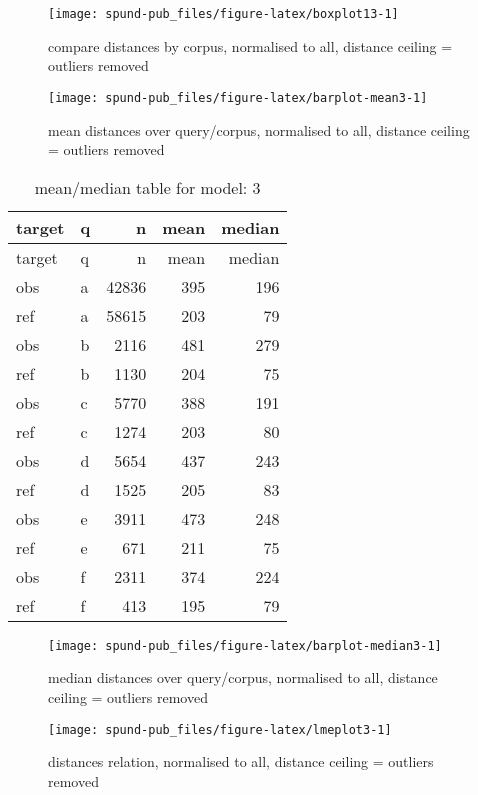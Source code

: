 \documentclass[
  12pt,
  oneside]{book}
\begin{document}
\begin{figure}[H]
\texttt{[image: spund-pub\_files/figure-latex/boxplot13-1]} \caption{compare distances by corpus, normalised to all, distance ceiling =  outliers removed}\label{fig:boxplot13}
\end{figure}

\begin{figure}[H]
\texttt{[image: spund-pub\_files/figure-latex/barplot-mean3-1]} \caption{mean distances over query/corpus, normalised to all, distance ceiling =  outliers removed}\label{fig:barplot-mean3}
\end{figure}

\begin{longtable}[]{@{}llrrr@{}}
\caption{\label{tab:dfe-table3}mean/median table for model: 3}\tabularnewline
\toprule\noalign{}
target & q & n & mean & median \\
\midrule\noalign{}
\endfirsthead
\toprule\noalign{}
target & q & n & mean & median \\
\midrule\noalign{}
\endhead
\bottomrule\noalign{}
\endlastfoot
obs & a & 42836 & 395 & 196 \\
ref & a & 58615 & 203 & 79 \\
obs & b & 2116 & 481 & 279 \\
ref & b & 1130 & 204 & 75 \\
obs & c & 5770 & 388 & 191 \\
ref & c & 1274 & 203 & 80 \\
obs & d & 5654 & 437 & 243 \\
ref & d & 1525 & 205 & 83 \\
obs & e & 3911 & 473 & 248 \\
ref & e & 671 & 211 & 75 \\
obs & f & 2311 & 374 & 224 \\
ref & f & 413 & 195 & 79 \\
\end{longtable}

\begin{figure}[H]
\texttt{[image: spund-pub\_files/figure-latex/barplot-median3-1]} \caption{median distances over query/corpus, normalised to all, distance ceiling =  outliers removed}\label{fig:barplot-median3}
\end{figure}

\begin{figure}[H]
\texttt{[image: spund-pub\_files/figure-latex/lmeplot3-1]} \caption{distances relation, normalised to all, distance ceiling =  outliers removed}\label{fig:lmeplot3}
\end{figure}
\end{document}
